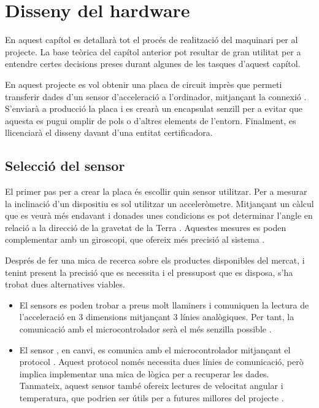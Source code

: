 \chapter{Disseny del hardware}

En aquest capítol es detallarà tot el procés de realització del maquinari per
al projecte. La base teòrica del capítol anterior pot resultar de gran utilitat
per a entendre certes decisions preses durant algunes de les tasques d'aquest
capítol.

En aquest projecte es vol obtenir una placa de circuit imprès que permeti
transferir dades d'un sensor d'acceleració a l'ordinador, mitjançant la connexió
. S'enviarà a producció la placa i es crearà un encapsulat senzill per
a evitar que aquesta es pugui omplir de pols o d'altres elements de l'entorn.
Finalment, es llicenciarà el disseny davant d'una entitat certificadora.

\section{Selecció del sensor}
\label{sec:sensor_selection}

El primer pas per a crear la placa és escollir quin sensor utilitzar. Per a
mesurar la inclinació d'un dispositiu es sol utilitzar un acceleròmetre.
Mitjançant un càlcul que es veurà més endavant i donades unes condicions es pot
determinar l'angle en relació a la direcció de la gravetat de la Terra
\cite{PedleyTilt}.
Aquestes mesures es poden complementar amb un giroscopi, que ofereix més
precisió al sistema \cite{6702711}.

Després de fer una mica de recerca sobre els productes disponibles del mercat,
i tenint present la precisió que es necessita i el pressupost que es disposa,
s'ha trobat dues alternatives viables.

\begin{itemize}
    \item El sensors  es poden trobar a preus molt llaminers i
    comuniquen la lectura de l'acceleració en 3 dimensions mitjançant 3 línies
    analògiques. Per tant, la comunicació amb el microcontrolador serà el més
    senzilla possible \cite{adxl335}.
    \item El sensor , en canvi, es comunica amb el microcontrolador
    mitjançant el protocol . Aquest protocol només necessita dues
    línies de comunicació, però implica implementar una mica de lògica per a
    recuperar les dades. Tanmateix, aquest sensor també ofereix lectures de
    velocitat angular i temperatura, que podrien ser útils per a futures
    millores del projecte \cite{mpu6050specs}.
\end{itemize}

